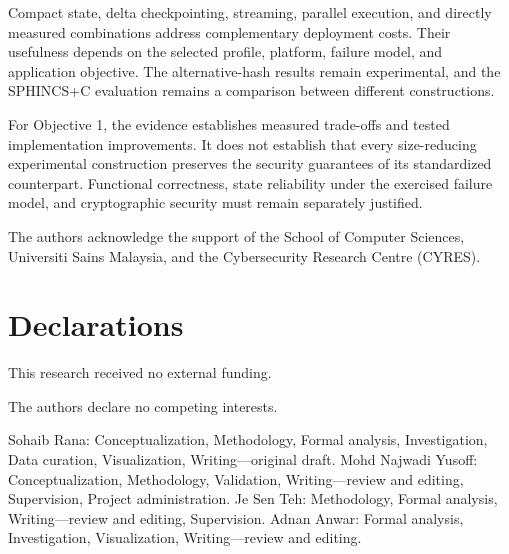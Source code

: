 \documentclass[pdflatex,sn-mathphys-num]{sn-jnl}
\begin{document}
Compact state, delta checkpointing, streaming, parallel execution,
and directly measured combinations address complementary deployment
costs. Their usefulness depends on the selected profile, platform,
failure model, and application objective. The alternative-hash results
remain experimental, and the SPHINCS+C evaluation remains a comparison
between different constructions.

For Objective 1, the evidence establishes measured trade-offs and
tested implementation improvements. It does not establish that every
size-reducing experimental construction preserves the security
guarantees of its standardized counterpart. Functional correctness,
state reliability under the exercised failure model, and cryptographic
security must remain separately justified.

\label{sec:conclusion}



\backmatter

The authors acknowledge the support of the School of Computer Sciences,
Universiti Sains Malaysia, and the Cybersecurity Research Centre
(CYRES).

\section*{Declarations}

This research received no external funding.

The authors declare no competing interests.



Sohaib Rana: Conceptualization, Methodology, Formal analysis,
Investigation, Data curation, Visualization, Writing---original draft.
Mohd Najwadi Yusoff: Conceptualization, Methodology, Validation,
Writing---review and editing, Supervision, Project administration.
Je Sen Teh: Methodology, Formal analysis, Writing---review and editing,
Supervision. Adnan Anwar: Formal analysis, Investigation,
Visualization, Writing---review and editing.


\end{document}
